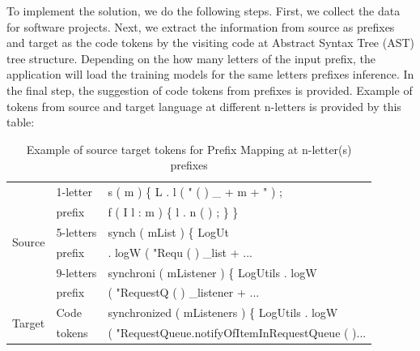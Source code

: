To implement the solution, we do the following steps. First, we collect the data for software projects. Next, we extract the information from source as prefixes and target as the code tokens by the visiting code at Abstract Syntax Tree (AST) tree structure. Depending on the how many letters of the input prefix, the application will load the training models for the same letters prefixes inference. In the final step, the suggestion of code tokens from prefixes is provided. Example of tokens from source and target language at different n-letters is provided by this table:

\begin{table}[]
\small
\label{tbl001}
\caption{Example of source target tokens for Prefix Mapping at n-letter(s) prefixes }
\begin{tabular}{|l|l|l|}
\hline
\multirow{6}{*}{Source} & 1-letter   & s ( m ) \{ L . l ( " ( ) \_ + m + " ) ;                        \\  
                & prefix  & f ( I l : m ) \{ l . n ( ) ; \} \}                       \\ \cline{2-3} 
                        & 5-letters  & synch ( mList ) \{ LogUt                                         \\  
                        & prefix & . logW ( "Requ ( ) \_list + ...                                          \\ \cline{2-3} 
                        & 9-letters  & synchroni ( mListener ) \{ LogUtils . logW       \\          
                        & prefix & ( "RequestQ ( ) \_listener + ...      \\ \hline
\multirow{2}{*}{Target}                  & Code       & synchronized ( mListeners ) \{ LogUtils . logW  \\
&   tokens   & ( "RequestQueue.notifyOfItemInRequestQueue ( )... \\
\hline
\end{tabular}
\end{table}



